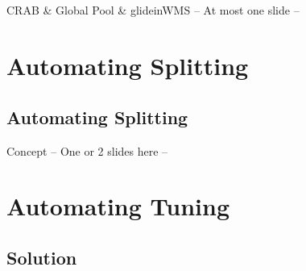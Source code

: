 \documentclass[8pt,mathserif,a4paper,oneside,pdf]{beamer}
\begin{document}
\subsection[]{}
\begin{frame}[fragile]{CRAB \& Global Pool \& glideinWMS}
  -- At most one slide --\\
\end{frame}

\section[Automating Splitting]{Automating Splitting}
\subsection[Automating Splitting]{Automating Splitting}
\begin{frame}[fragile]{Concept}
  -- One or 2 slides here --\\
\end{frame}

\section[Automating Tuning]{Automating Tuning}

\subsection[Current Implementation]{Solution}
\end{document}
